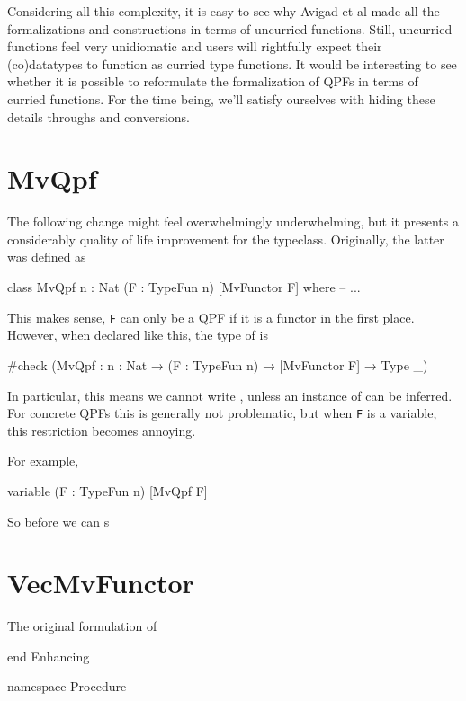 \documentclass[titlepage]{report}
\newenvironment{leanhidden}{\expandafter\comment}{\expandafter\endcomment}
\begin{document}
Considering all this complexity, it is easy to see why Avigad et al made all the formalizations and
constructions in terms of uncurried functions. 
Still, uncurried functions feel very unidiomatic and users will rightfully expect their (co)datatypes
to function as curried type functions. 
It would be interesting to see whether it is possible to reformulate the formalization of QPFs in
terms of curried functions. 
For the time being, we'll satisfy ourselves with hiding these details throughs
 and  conversions.



\section{MvQpf}
The following change might feel overwhelmingly underwhelming, but it presents a considerably quality 
of life improvement for the  typeclass. Originally, the latter was defined as
\begin{leancode}
    class MvQpf {n : Nat} (F : TypeFun n) [MvFunctor F] where
        -- ...
\end{leancode}
This makes sense, \texttt{F} can only be a QPF if it is a functor in the first place.
However, when declared like this, the type of  is 
\begin{leancode}
    #check (MvQpf : {n : Nat} → (F : TypeFun n) → [MvFunctor F] → Type _)
\end{leancode}
In particular, this means we cannot write , unless an instance of 
can be inferred. For concrete QPFs this is generally not problematic, but when \texttt{F} is a
variable, this restriction becomes annoying. 

For example, 
\begin{leancode}
    variable (F : TypeFun n) [MvQpf F]
\end{leancode}

So before we can s



\section{VecMvFunctor}

The original formulation of 







\begin{leanhidden}
    end Enhancing

    namespace Procedure
\end{leanhidden}
\end{document}
